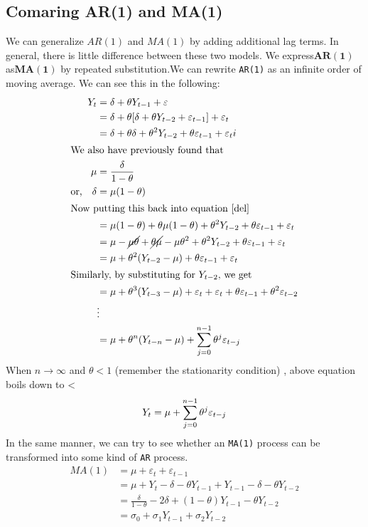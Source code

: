 \documentclass{book}
\begin{document}
\subsection{Comaring AR(1) and MA(1)}
We can generalize $AR(1)$ and $MA(1)$ by adding additional lag terms. In general, there is little difference between these two models. We express$\mathbf{AR(1)}$  as$\mathbf{MA(1)}$ by repeated substitution.We can rewrite \texttt{AR(1)} as an infinite order of moving average. We can see this in the following:
\begin{align}
	Y_t &=\delta+\theta Y_{t-1}+\varepsilon \\
	&=\delta+\theta [\delta+\theta Y_{t-2}+\varepsilon_{t-1}]+\varepsilon_t\\
	&=\delta+\theta \delta+\theta^2 Y_{t-2}+\theta \varepsilon_{t-1}+\varepsilon_ti \label{del}\\
\intertext{We also have previously found that}
\mu &=\frac{\delta}{1-\theta}\\
\text{or,}\quad \delta&=\mu (1-\theta)\\
\intertext{Now putting this back into equation \eqref{del}}
	&=\mu (1-\theta)+\theta \mu (1-\theta)+\theta^2 Y_{t-2}+\theta \varepsilon_{t-1}+\varepsilon_t\\
	&=\mu - \cancel{\mu \theta}+ \cancel{\theta \mu} -\mu \theta^2+\theta^2 Y_{t-2}+\theta \varepsilon_{t-1}+\varepsilon_t\\
	&=\mu+\theta^2(Y_{t-2}-\mu)+\theta \varepsilon_{t-1}+\varepsilon_t\\
	\intertext{Similarly, by substituting for $Y_{t-2}$, we get}
	&=\mu+\theta^3(Y_{t-3}-\mu)+\varepsilon_t+\varepsilon_t+\theta \varepsilon_{t-1}+\theta^2 \varepsilon_{t-2}\\
	&\vdots\\
	&=\mu+\theta^n(Y_{t-n}-\mu)+\sum_{j=0}^{n-1}\theta^j \varepsilon_{t-j}\\
	\label{}
\end{align}
When $n\longrightarrow \infty$ and $\theta <1$ (remember the stationarity condition) , above equation boils down to 
	<\begin{equation}
		Y_t=\mu+\sum_{j=0}^{n-1}\theta^j \varepsilon_{t-j}\\
		\label{eqtrar}
	\end{equation}
	In the same manner, we can try to see whether an \texttt{MA(1)} process can be transformed into some kind of \texttt{AR} process. 
	\begin{align}
		MA(1) & =\mu+\varepsilon_t+\varepsilon_{t-1}\\
		& = \mu+Y_t-\delta - \theta Y_{t-1}+Y_{t-1}-\delta-\theta Y_{t-2} \\
		&=\frac{\delta}{1-\theta}-2 \delta+(1-\theta)Y_{t-1}-\theta Y_{t-2} \\
		&=\sigma_0+\sigma_1 Y_{t-1}+\sigma_2 Y_{t-2}
		\label{}
	\end{align}
\end{document}
